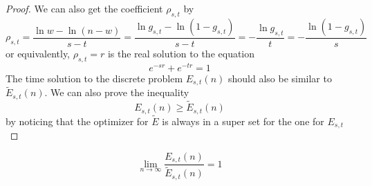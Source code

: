 \documentclass[]{article}
\begin{document}
\begin{proof}
	We can also get the coefficient $\rho_{s,t}$ by
	\[
	\rho_{s,t} = \frac{\ln w - \ln (n-w)}{s -t } = \frac{\ln g_{s,t} - \ln (1-g_{s,t})}{s -t } = -\frac{\ln g_{s,t}}{t}= - \frac{\ln(1-g_{s,t})}{s}
	\]
	or equivalently, $\rho_{s,t} = r$ is the real solution to the equation
	\[
	e^{-sr} + e^{-tr} = 1
	\]
	The time solution to the discrete problem $E_{s,t}(n)$ should also be similar to $\tilde{E}_{s,t}(n)$. We can also prove the inequality
	\[
	E_{s,t}(n) \geq \tilde{E}_{s,t}(n)
	\]
	by noticing that the optimizer for $\tilde{E}$ is always in a super set for the one for $E_{s,t}$

\end{proof}

\vspace{1cm}
\begin{lemma}[$E$ limit]
	\[
	\lim_{n\to\infty}\frac{E_{s,t}(n)}{\tilde{E}_{s,t}(n)} = 1
	\]
\end{lemma}
\end{document}
